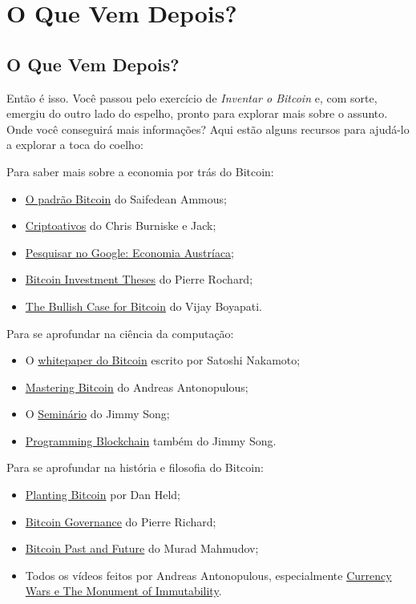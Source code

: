 \part{O Que Vem Depois?}
\label{ch:capitulo10}
\chapter*{O Que Vem Depois?}

Então é isso. Você passou pelo exercício de \textit{Inventar o Bitcoin} e, com sorte, emergiu do outro lado do espelho, pronto para explorar mais sobre o assunto. Onde você conseguirá mais informações? Aqui estão alguns recursos para ajudá-lo a explorar a toca do coelho:

Para saber mais sobre a economia por trás do Bitcoin:

\begin{itemize}
\item \href{https://amzn.to/2V1vQ62}{O padrão Bitcoin} do Saifedean Ammous;
\item \href{https://amzn.to/3jwpiG7}{Criptoativos} do Chris Burniske e Jack;
\item \href{https://tinyurl.com/bzrkbb5u}{Pesquisar no Google: Economia Austríaca};
\item \href{https://tinyurl.com/3yn8amt3}{Bitcoin Investment Theses} do Pierre Rochard;
\item \href{https://tinyurl.com/f8e4wn5h}{The Bullish Case for Bitcoin} do Vijay Boyapati.
\end{itemize}

Para se aprofundar na ciência da computação:

\begin{itemize}
\item O \href{https://bitcoin.org/bitcoin.pdf}{whitepaper do Bitcoin} escrito por Satoshi Nakamoto;
\item \href{https://amzn.to/3gOqaUH}{Mastering Bitcoin} do Andreas Antonopulous;
\item O \href{https://programmingbitcoin.com/#programming-blockchain}{Seminário} do Jimmy Song;
\item \href{https://programmingblockchain.gitbook.io/programmingblockchain/}{Programming Blockchain} também do Jimmy Song.
\end{itemize}

Para se aprofundar na história e filosofia do Bitcoin:

\begin{itemize}
\item \href{https://tinyurl.com/Planting-Bitcoin}{Planting Bitcoin} por Dan Held;
\item \href{https://tinyurl.com/mzy6jkz4}{Bitcoin Governance} do Pierre Richard;
\item \href{https://tinyurl.com/y8vueb88}{Bitcoin Past and Future} do Murad Mahmudov;
\item Todos os vídeos feitos por Andreas Antonopulous, especialmente \href{https://www.youtube.com/user/aantonop}{Currency Wars e The Monument of Immutability}.
\end{itemize}

